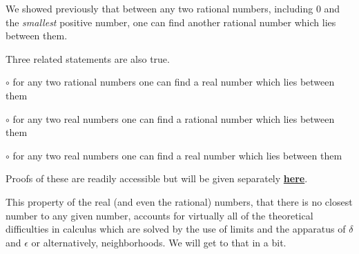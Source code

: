 \documentclass[11pt, oneside]{article}
\begin{document}
We showed previously that between any two rational numbers, including $0$ and the \emph{smallest} positive number, one can find another rational number which lies between them.

Three related statements are also true.

$\circ$ for any two rational numbers one can find a real number which lies between them

$\circ$ for any two real numbers one can find a rational number which lies between them

$\circ$ for any two real numbers one can find a real number which lies between them

Proofs of these are readily accessible but will be given separately \hyperref[sec:continuum]{\textbf{here}}.

This property of the real (and even the rational) numbers, that there is no closest number to any given number, accounts for virtually all of the theoretical difficulties in calculus which are solved by the use of limits and the apparatus of $\delta$ and $\epsilon$ or alternatively, neighborhoods.  We will get to that in a bit.
\end{document}
